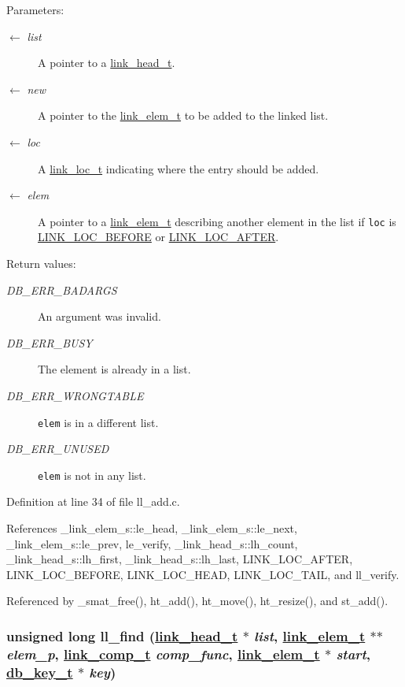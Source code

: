 \begin{Desc}
\item[Parameters:]
\begin{description}
\item[\mbox{$\leftarrow$} {\em list}]A pointer to a \hyperlink{group__dbprim__link_ga0}{link\_\-head\_\-t}. \item[\mbox{$\leftarrow$} {\em new}]A pointer to the \hyperlink{group__dbprim__link_ga1}{link\_\-elem\_\-t} to be added to the linked list. \item[\mbox{$\leftarrow$} {\em loc}]A \hyperlink{group__dbprim__link_ga4}{link\_\-loc\_\-t} indicating where the entry should be added. \item[\mbox{$\leftarrow$} {\em elem}]A pointer to a \hyperlink{group__dbprim__link_ga1}{link\_\-elem\_\-t} describing another element in the list if {\tt loc} is \hyperlink{group__dbprim__link_gga28a135}{LINK\_\-LOC\_\-BEFORE} or \hyperlink{group__dbprim__link_gga28a136}{LINK\_\-LOC\_\-AFTER}.\end{description}
\end{Desc}
\begin{Desc}
\item[Return values:]
\begin{description}
\item[{\em DB\_\-ERR\_\-BADARGS}]An argument was invalid. \item[{\em DB\_\-ERR\_\-BUSY}]The element is already in a list. \item[{\em DB\_\-ERR\_\-WRONGTABLE}]{\tt elem} is in a different list. \item[{\em DB\_\-ERR\_\-UNUSED}]{\tt elem} is not in any list.\end{description}
\end{Desc}


Definition at line 34 of file ll\_\-add.c.

References \_\-link\_\-elem\_\-s::le\_\-head, \_\-link\_\-elem\_\-s::le\_\-next, \_\-link\_\-elem\_\-s::le\_\-prev, le\_\-verify, \_\-link\_\-head\_\-s::lh\_\-count, \_\-link\_\-head\_\-s::lh\_\-first, \_\-link\_\-head\_\-s::lh\_\-last, LINK\_\-LOC\_\-AFTER, LINK\_\-LOC\_\-BEFORE, LINK\_\-LOC\_\-HEAD, LINK\_\-LOC\_\-TAIL, and ll\_\-verify.

Referenced by \_\-smat\_\-free(), ht\_\-add(), ht\_\-move(), ht\_\-resize(), and st\_\-add().\hypertarget{group__dbprim__link_ga9}{
\subsubsection[ll\_\-find]{\setlength{\rightskip}{0pt plus 5cm}unsigned long ll\_\-find (\hyperlink{struct__link__head__s}{link\_\-head\_\-t} $\ast$ {\em list}, \hyperlink{struct__link__elem__s}{link\_\-elem\_\-t} $\ast$$\ast$ {\em elem\_\-p}, \hyperlink{group__dbprim__link_ga3}{link\_\-comp\_\-t} {\em comp\_\-func}, \hyperlink{struct__link__elem__s}{link\_\-elem\_\-t} $\ast$ {\em start}, \hyperlink{struct__db__key__s}{db\_\-key\_\-t} $\ast$ {\em key})}}
\label{group__dbprim__link_ga9}


